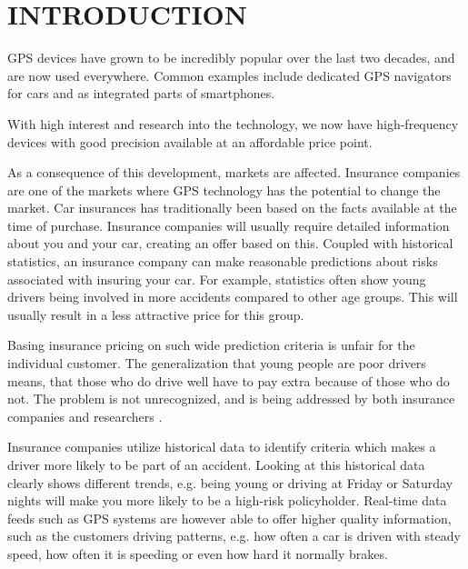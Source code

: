 \section{INTRODUCTION}
\label{sec:intro}



GPS devices have grown to be incredibly popular over the last two decades, and are now used everywhere. Common examples include dedicated GPS navigators for cars and as integrated parts of smartphones.

With high interest and research into the technology, we now have high-frequency devices with good precision available at an affordable price point.

As a consequence of this development, markets are affected. Insurance companies are one of the markets where GPS technology has the potential to change the market. Car insurances has traditionally been based on the facts available at the time of purchase. Insurance companies will usually require detailed information about you and your car, creating an offer based on this. Coupled with historical statistics, an insurance company can make reasonable predictions about risks associated with insuring your car. For example, statistics often show young drivers being involved in more accidents compared to other age groups\cite{accidents}. This will usually result in a less attractive price for this group.

Basing insurance pricing on such wide prediction criteria is unfair for the individual customer. The generalization that young people are poor drivers means, that those who do drive well have to pay extra because of those who do not. The problem is not unrecognized, and is being addressed by both insurance companies and researchers \cite{mar:ubi16}.

Insurance companies utilize historical data to identify criteria which makes a driver more likely to be part of an accident. Looking at this historical data clearly shows different trends\cite{url:forbes}, e.g. being young or driving at Friday or Saturday nights will make you more likely to be a high-risk policyholder. Real-time data feeds such as GPS systems are however able to offer higher quality information, such as the customers driving patterns, e.g. how often a car is driven with steady speed, how often it is speeding or even how hard it normally brakes.

